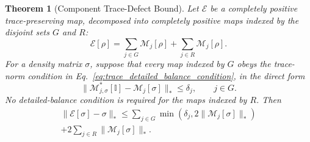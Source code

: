 \documentclass[aps,floatfix,10pt,amssymb,amsfont,amsmath,superscriptaddress,float,nofootinbib,longbibliography,nobalancelastpage,twocolumn]{revtex4-2}
\newtheorem{theorem}{Theorem}
\begin{document}
\begin{theorem}[Component Trace-Defect Bound]
\label{theorem:quantumapproximatedeatildedbalance}
Let $\mathcal{E}$ be a completely positive trace-preserving map, decomposed into completely positive maps indexed by the disjoint sets $G$ and $R$:
\begin{equation}
    \mathcal{E}[\rho] = \sum_{j\in G}\mathcal{M}_j[\rho]+\sum_{j\in R}\mathcal{M}_j[\rho].
\end{equation}
For a density matrix $\sigma$, suppose that every map indexed by $G$ obeys the trace-norm condition in Eq.~\eqref{eq:trace_detailed_balance_condition}, in the direct form
\begin{equation}
    \|\mathcal{M}_{j,\sigma}^*[\mathbb{I}]-\mathcal{M}_j[\sigma]\|_*\leq\delta_j,
    \qquad j\in G.
\end{equation}
No detailed-balance condition is required for the maps indexed by $R$. Then
\begin{multline}
     \|\mathcal{E}[\sigma]-\sigma\|_* \leq
     \sum_{j\in G}\min\left(\delta_j,2\|\mathcal{M}_j[\sigma]\|_*\right)\\
     +2\sum_{j\in R}\|\mathcal{M}_j[\sigma]\|_*.
\end{multline}
\end{theorem}
\end{document}
